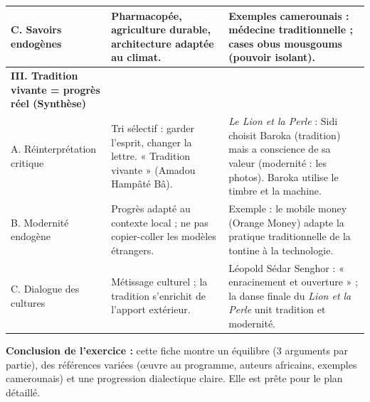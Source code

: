 \documentclass[11pt]{article}
\begin{document}
\begin{exoresolu}
\begin{center}
\begin{tabularx}{\linewidth}{|l|X|X|}
C. Savoirs endogènes & Pharmacopée, agriculture durable, architecture adaptée au climat. & Exemples camerounais : médecine traditionnelle ; cases obus mousgoums (pouvoir isolant). \\ \hline
\textbf{III. Tradition vivante = progrès réel (Synthèse)} & & \\ \hline
A. Réinterprétation critique & Tri sélectif : garder l'esprit, changer la lettre. « Tradition vivante » (Amadou Hampâté Bâ). & \emph{Le Lion et la Perle} : Sidi choisit Baroka (tradition) mais a conscience de sa valeur (modernité : les photos). Baroka utilise le timbre et la machine. \\ \hline
B. Modernité endogène & Progrès adapté au contexte local ; ne pas copier-coller les modèles étrangers. & Exemple : le mobile money (Orange Money) adapte la pratique traditionnelle de la tontine à la technologie. \\ \hline
C. Dialogue des cultures & Métissage culturel ; la tradition s'enrichit de l'apport extérieur. & Léopold Sédar Senghor : « enracinement et ouverture » ; la danse finale du \emph{Lion et la Perle} unit tradition et modernité. \\ \hline
\end{tabularx}
\end{center}

\textbf{Conclusion de l'exercice :} cette fiche montre un équilibre (3 arguments par partie), des références variées (œuvre au programme, auteurs africains, exemples camerounais) et une progression dialectique claire. Elle est prête pour le plan détaillé.
\end{exoresolu}
\end{document}
